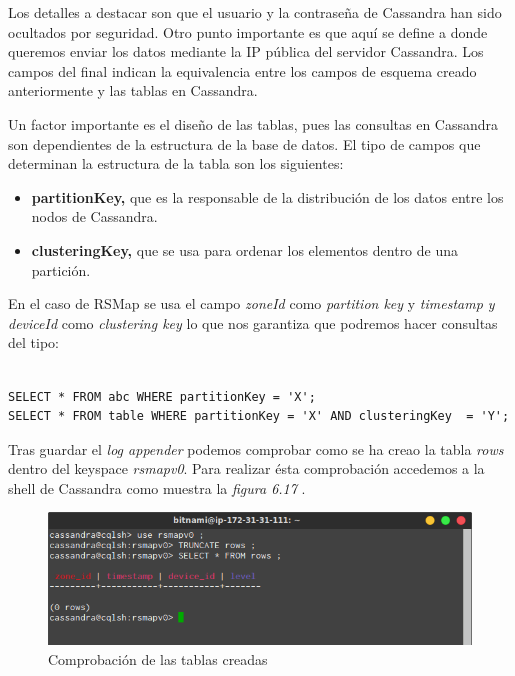 \newpage

Los detalles a destacar son que el usuario y la contraseña de Cassandra han sido ocultados por seguridad. Otro punto importante es que aquí se define a donde queremos enviar los datos mediante la IP pública del servidor Cassandra.
Los campos del final indican la equivalencia entre los campos de esquema creado anteriormente y las tablas en Cassandra.

Un factor importante es el diseño de las tablas, pues las consultas en Cassandra son dependientes de la estructura de la base de datos. El tipo de campos que determinan la estructura de la tabla son los siguientes:

\begin{itemize}
\item \textbf{partitionKey, } que es la responsable de la distribución de los datos entre los nodos de Cassandra.
\item \textbf{clusteringKey, } que se usa para ordenar los elementos dentro de una partición.
\end{itemize}

En el caso de RSMap se usa el campo \textit{zoneId} como \textit{partition key} y \textit{timestamp y deviceId} como \textit{clustering key} lo que nos garantiza que podremos hacer consultas del tipo:


\begin{lstlisting}[language=cql,caption={Mécanica de consultas en CQL según la estructura de tablas},label={lst:json_personal}]

SELECT * FROM abc WHERE partitionKey = 'X';
SELECT * FROM table WHERE partitionKey = 'X' AND clusteringKey  = 'Y';

\end{lstlisting}

\bigskip

Tras guardar el \textit{log appender} podemos comprobar como se ha creao la tabla \textit{rows} dentro del keyspace \textit{rsmapv0}. Para realizar ésta comprobación accedemos a la shell de Cassandra como muestra la \textit{figura 6.17	}.

\begin{figure}[!ht]
  \begin{center}
    \includegraphics[scale=0.65]{../images/cassandra/4.png}
		\caption{Comprobación de las tablas creadas}
    \label{fig:kaa}
	\end{center}
\end{figure}

